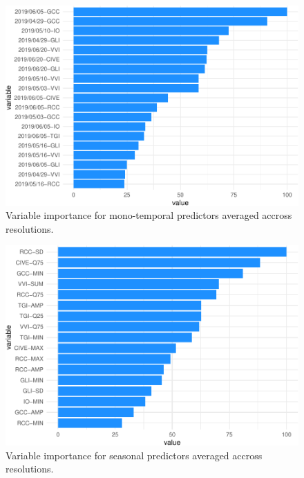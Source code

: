 \documentclass[]{article}
\begin{document}
\begin{figure}[H]

{\centering \includegraphics{report_files/figure-latex/var_imp_indices-1} 

}

\caption{Variable importance for mono-temporal predictors averaged accross resolutions.}\label{fig:var_imp_indices}
\end{figure}

\begin{figure}[H]

{\centering \includegraphics{report_files/figure-latex/var_imp_season-1} 

}

\caption{Variable importance for seasonal predictors averaged accross resolutions.}\label{fig:var_imp_season}
\end{figure}
\end{document}
